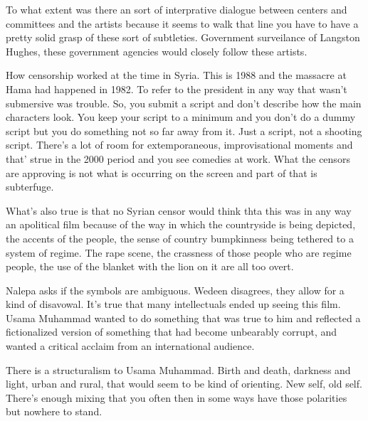 \documentclass{article}
\begin{document}
\vspace{5mm}

To what extent was there an sort of interprative dialogue between centers and committees and the artists because it seems to walk that line you have to have a pretty solid grasp of these sort of subtleties.  Government surveilance of Langston Hughes, these government agencies would closely follow these artists.  

\vspace{5mm}

How censorship worked at the time in Syria.  This is 1988 and the massacre at Hama had happened in 1982.  To refer to the president in any way that wasn't submersive was trouble.  So, you submit a script and don't describe how the main characters look.  You keep your script to a minimum and you don't do a dummy script but you do something not so far away from it.  Just a script, not a shooting script.  There's a lot of room for extemporaneous, improvisational moments and that' strue in the 2000 period and you see comedies at work.  What the censors are approving is not what is occurring on the screen and part of that is subterfuge.  

\vspace{5mm}

What's also true is that no Syrian censor would think thta this was in any way an apolitical film because of the way in which the countryside is being depicted, the accents of the people, the sense of country bumpkinness being tethered to a system of regime.  The rape scene, the crassness of those people who are regime people, the use of the blanket with the lion on it are all too overt.  

\vspace{5mm}

Nalepa asks if the symbols are ambiguous.  Wedeen disagrees, they allow for a kind of disavowal.  It's true that many intellectuals ended up seeing this film.  Usama Muhammad wanted to do something that was true to him and reflected a fictionalized version of something that had become unbearably corrupt, and wanted a critical acclaim from an international audience.  

\vspace{5mm}

There is a structuralism to Usama Muhammad.  Birth and death, darkness and light, urban and rural, that would seem to be kind of orienting.  New self, old self.  There's enough mixing that you often then in some ways have those polarities but nowhere to stand.  
\end{document}
